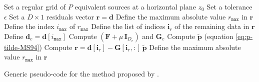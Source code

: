 \begin{algorithm}
	\Input{}
	Set a regular grid of $P$ equivalent sources at a horizontal plane $z_{0}$ \;
	Set a tolerance $\epsilon$ \;
	Set a $D \times 1$ residuals vector $\mathbf{r} = \mathbf{d}$ \;
	Define the maximum absolute value $r_{\mathtt{max}}$ in $\mathbf{r}$ \; 
	Define the index $i_{\mathtt{max}}$ of $r_{\mathtt{max}}$ \;
	Define the list of indices $\mathbf{i}_{r}$ of the remaining data in $\mathbf{r}$ \;
	Define $\mathbf{d}_{e} = \mathbf{d}[i_{\mathtt{max}}] $ \;
	Compute $\left(\mathbf{F} + \mu \, \mathbf{I}_{D_{e}} \right)$ and $\mathbf{G}_{e}$ \;
	Compute $\tilde{\mathbf{p}}$ (equation \ref{eq:p-tilde-MS94}) \;
	Compute $\mathbf{r} = \mathbf{d}[\mathbf{i}_{r}] - \mathbf{G}[\mathbf{i}_{r}, :] \, \tilde{\mathbf{p}}$ \;
	Define the maximum absolute value $r_{\mathtt{max}}$ in $\mathbf{r}$ \; 
	\caption{Generic pseudo-code for the method proposed by \cite{mendonca-silva1994}.}
	\label{alg:MS94}
\end{algorithm}


